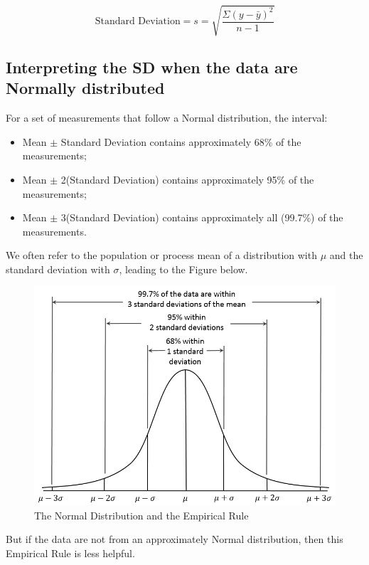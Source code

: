 \documentclass[
]{book}
\providecommand{\tightlist}{%
  \setlength{\itemsep}{0pt}\setlength{\parskip}{0pt}}
\begin{document}
\[
\mbox{Standard Deviation} = s = \sqrt{\frac{\Sigma (y - \bar{y})^2}{n-1}}
\]

\hypertarget{interpreting-the-sd-when-the-data-are-normally-distributed}{%
\subsection{Interpreting the SD when the data are Normally distributed}\label{interpreting-the-sd-when-the-data-are-normally-distributed}}

For a set of measurements that follow a Normal distribution, the interval:

\begin{itemize}
\tightlist
\item
  Mean \(\pm\) Standard Deviation contains approximately 68\% of the measurements;
\item
  Mean \(\pm\) 2(Standard Deviation) contains approximately 95\% of the measurements;
\item
  Mean \(\pm\) 3(Standard Deviation) contains approximately all (99.7\%) of the measurements.
\end{itemize}

We often refer to the population or process mean of a distribution with \(\mu\) and the standard deviation with \(\sigma\), leading to the Figure below.

\begin{figure}
\includegraphics[width=0.9\linewidth]{figures/Empirical_Rule} \caption{The Normal Distribution and the Empirical Rule}\label{fig:EmpRule-fig1}
\end{figure}

But if the data are not from an approximately Normal distribution, then this Empirical Rule is less helpful.
\end{document}
